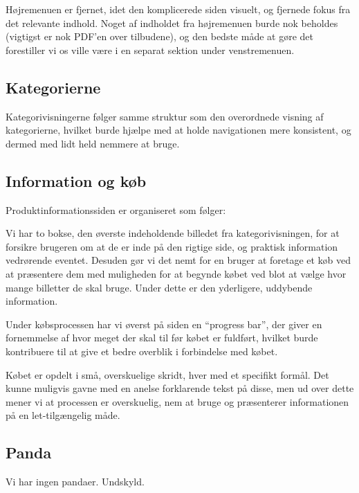 Højremenuen er fjernet, idet den komplicerede siden visuelt, og fjernede fokus fra det relevante indhold.
Noget af indholdet fra højremenuen burde nok beholdes (vigtigst er nok PDF'en over tilbudene), og den bedste måde at gøre det forestiller vi os ville være i en separat sektion under venstremenuen. 

\subsection{Kategorierne}
Kategorivisningerne følger samme struktur som den overordnede visning af kategorierne, hvilket burde hjælpe med at holde navigationen mere konsistent, og dermed med lidt held nemmere at bruge. 

\subsection{Information og køb}
Produktinformationssiden er organiseret som følger:

Vi har to bokse, den øverste indeholdende billedet fra kategorivisningen, for at forsikre brugeren om at de er inde på den rigtige side, og praktisk information vedrørende eventet. Desuden gør vi det nemt for en bruger at foretage et køb ved at præsentere dem med muligheden for at begynde købet ved blot at vælge hvor mange billetter de skal bruge. Under dette er den yderligere, uddybende information.

Under købsprocessen har vi øverst på siden en ``progress bar'', der giver en fornemmelse af hvor meget der skal til før købet er fuldført, hvilket burde kontribuere til at give et bedre overblik i forbindelse med købet.

Købet er opdelt i små, overskuelige skridt, hver med et specifikt formål. Det kunne muligvis gavne med en anelse forklarende tekst på disse, men ud over dette mener vi at processen er overskuelig, nem at bruge og præsenterer informationen på en let-tilgængelig måde.

\subsection{Panda}
Vi har ingen pandaer. Undskyld.
